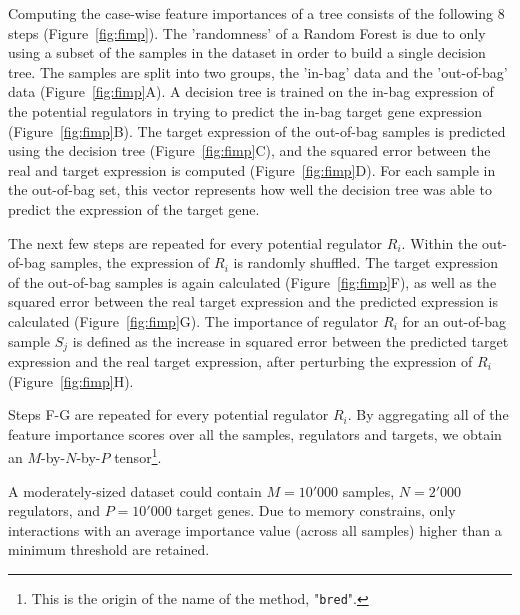 Computing the case-wise feature importances of a tree consists of the following 8 steps (Figure~\ref{fig:fimp}).
The 'randomness' of a Random Forest is due to only using a subset of the samples in the dataset in order to build a single decision tree. The samples are split into two groups, the 'in-bag' data and the 'out-of-bag' data (Figure~\ref{fig:fimp}A). A decision tree\cite{breiman_classificationregressiontrees_1984} is trained on the in-bag expression of the potential regulators in trying to predict the in-bag target gene expression (Figure~\ref{fig:fimp}B). The target expression of the out-of-bag samples is predicted using the decision tree (Figure~\ref{fig:fimp}C), and the squared error between the real and target expression is computed (Figure~\ref{fig:fimp}D). For each sample in the out-of-bag set, this vector represents how well the decision tree was able to predict the expression of the target gene.

The next few steps are repeated for every potential regulator $R_i$. Within the out-of-bag samples, the expression of $R_i$ is randomly shuffled. The target expression of the out-of-bag samples is again calculated (Figure~\ref{fig:fimp}F), as well as the squared error between the real target expression and the predicted expression is calculated (Figure~\ref{fig:fimp}G). The importance of regulator $R_i$ for an out-of-bag sample $S_j$ is defined as the increase in squared error between the predicted target expression and the real target expression, after perturbing the expression of $R_i$ (Figure~\ref{fig:fimp}H). 

Steps F-G are repeated for every potential regulator $R_i$. By aggregating all of the feature importance scores over all the samples, regulators and targets, we obtain an $M$-by-$N$-by-$P$ tensor\footnote{This is the origin of the name of the method, "\texttt{bred}".}. 

A moderately-sized dataset could contain $M=10'000$ samples, $N=2'000$ regulators, and $P=10'000$ target genes. Due to memory constrains, only interactions with an average importance value (across all samples) higher than a minimum threshold are retained.

